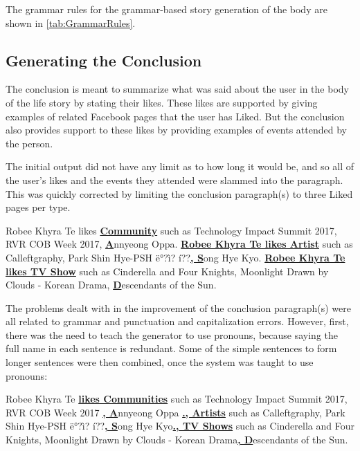 The grammar rules for the grammar-based story generation of the body are shown in \ref{tab:GrammarRules}.

\subsection{Generating the Conclusion}
The conclusion is meant to summarize what was said about the user in the body of the life story by stating their likes. These likes are supported by giving examples of related Facebook pages that the user has Liked. But the conclusion also provides support to these likes by providing examples of events attended by the person.

The initial output did not have any limit as to how long it would be, and so all of the user’s likes and the events they attended were slammed into the paragraph. This was quickly corrected by limiting the conclusion paragraph(s) to three Liked pages per type.

\begin{center} Robee Khyra Te likes \underline{\textbf{Community}} such as Technology Impact Summit 2017, RVR COB Week 2017, \underline{\textbf{A}}nnyeong Oppa. \newline
	\underline{\textbf{Robee Khyra Te likes Artist}} such as Calleftgraphy, Park Shin Hye-PSH ë°?ì? í??\underline{\textbf{, S}}ong Hye Kyo. \newline
	\underline{\textbf{Robee Khyra Te likes TV Show}} such as Cinderella and Four Knights, Moonlight Drawn by Clouds - Korean Drama, \underline{\textbf{D}}escendants of the Sun. \end{center}

The problems dealt with in the improvement of the conclusion paragraph(s) were all related to grammar and punctuation and capitalization errors. However, first, there was the need to teach the generator to use pronouns, because saying the full name in each sentence is redundant. Some of the simple sentences to form longer sentences were then combined, once the system was taught to use pronouns:

\begin{center} Robee Khyra Te \underline{\textbf{likes Communities}} such as Technology Impact Summit 2017, RVR COB Week 2017 \underline{\textbf{, A}}nnyeong Oppa \underline{\textbf{., Artists}} such as Calleftgraphy, Park Shin Hye-PSH ë°?ì? í??\underline{\textbf{, S}}ong Hye Kyo\underline{\textbf{., TV Shows}} such as Cinderella and Four Knights, Moonlight Drawn by Clouds - Korean Drama\underline{\textbf{, D}}escendants of the Sun. \end{center}

